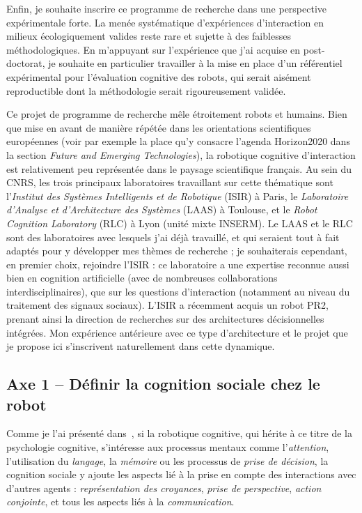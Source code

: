 \documentclass[a4paper]{article}
\begin{document}
Enfin, je souhaite inscrire ce programme de recherche dans une perspective
expérimentale forte. La menée systématique d'expériences d'interaction en
milieux écologiquement valides reste rare et sujette à des faiblesses
méthodologiques. En m'appuyant sur l'expérience que j'ai acquise en
post-doctorat, je souhaite en particulier travailler à la mise en place d'un
référentiel expérimental pour l'évaluation cognitive des robots, qui serait
aisément reproductible dont la méthodologie serait rigoureusement validée.

Ce projet de programme de recherche mêle étroitement robots et humains. Bien que
mise en avant de manière répétée dans les orientations scientifiques européennes
(voir par exemple la place qu'y consacre l'agenda Horizon2020 dans la section
\emph{Future and Emerging Technologies}), la robotique cognitive d'interaction
est relativement peu représentée dans le paysage scientifique français. Au sein
du CNRS, les trois principaux laboratoires travaillant sur cette thématique sont
l'\emph{Institut des Systèmes Intelligents et de Robotique} (ISIR) à Paris, le
\emph{Laboratoire d'Analyse et d'Architecture des Systèmes} (LAAS) à Toulouse,
et le \emph{Robot Cognition Laboratory} (RLC) à Lyon (unité mixte INSERM). Le
LAAS et le RLC sont des laboratoires avec lesquels j'ai déjà travaillé, et qui
seraient tout à fait adaptés pour y développer mes thèmes de recherche ; je
souhaiterais cependant, en premier choix, rejoindre l'ISIR : ce laboratoire a
une expertise reconnue aussi bien en cognition artificielle (avec de nombreuses
collaborations interdisciplinaires), que sur les questions d'interaction
(notamment au niveau du traitement des signaux sociaux). L'ISIR a récemment
acquis un robot PR2, prenant ainsi la direction de recherches sur des
architectures décisionnelles intégrées. Mon expérience antérieure avec ce type
d'architecture et le projet que je propose ici s'inscrivent naturellement dans
cette dynamique.

\subsection{Axe 1 -- Définir la cognition sociale chez le robot}

Comme je l'ai présenté dans~\cite{lemaignan2014human}, si la robotique
cognitive, qui hérite à ce titre de la psychologie cognitive, s'intéresse aux
processus mentaux comme l'\emph{attention}, l'utilisation du \emph{langage}, la
\emph{mémoire} ou les processus de \emph{prise de décision}, la cognition
sociale y ajoute les aspects lié à la prise en compte des interactions avec
d'autres agents : \emph{représentation des croyances}, \emph{prise de
perspective}, \emph{action conjointe}, et tous les aspects liés à la
\emph{communication}.
\end{document}
